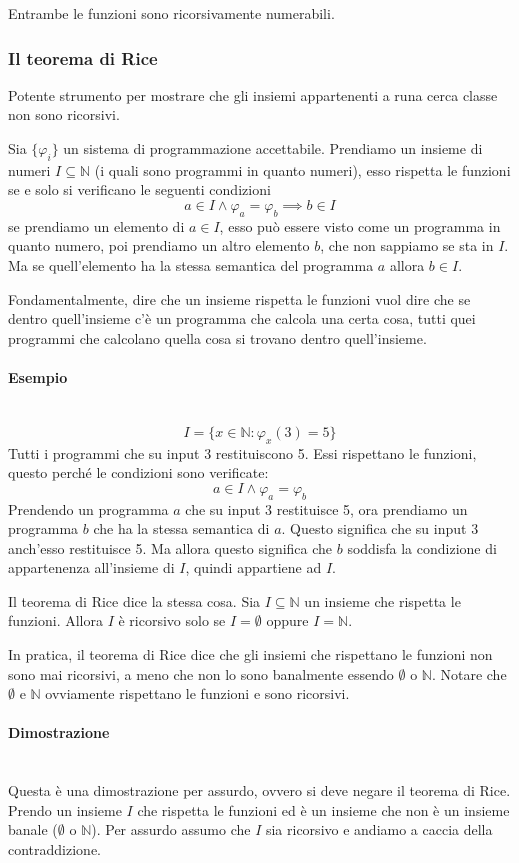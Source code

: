 \documentclass{article}
\begin{document}
Entrambe le funzioni sono ricorsivamente numerabili.

\subsubsection{Il teorema di Rice}
Potente strumento per mostrare che gli insiemi appartenenti a runa cerca classe non
sono ricorsivi.

Sia $\{\varphi_i\}$ un sistema di programmazione accettabile. Prendiamo un insieme di numeri
$I\subseteq\mathbb{N}$ (i quali sono programmi in quanto numeri),
esso rispetta le funzioni se e solo si verificano le seguenti condizioni
$$a\in I\land\varphi_a=\varphi_b\implies b\in I$$
se prendiamo un elemento di $a\in I$, esso può essere visto come un programma in quanto numero, poi
prendiamo un altro elemento $b$, che non sappiamo se sta in $I$. Ma se quell'elemento
ha la stessa semantica del programma $a$ allora $b\in I$.

Fondamentalmente, dire che un insieme rispetta le funzioni vuol dire che se dentro quell'insieme
c'è un programma che calcola una certa cosa, tutti quei programmi che calcolano quella cosa
si trovano dentro quell'insieme.

\paragraph{Esempio}\mbox{}\\
$$I=\{x\in\mathbb{N}:\varphi_x(3)=5\}$$
Tutti i programmi che su input 3 restituiscono 5. Essi rispettano le funzioni, questo
perché le condizioni sono verificate:
$$a\in I\land \varphi_a=\varphi_b$$
Prendendo un programma $a$ che su input 3 restituisce 5, ora prendiamo un programma
$b$ che ha la stessa semantica di $a$. Questo significa che su input 3 anch'esso restituisce
5. Ma allora questo significa che $b$ soddisfa la condizione di appartenenza all'insieme di
$I$, quindi appartiene ad $I$.

Il teorema di Rice dice la stessa cosa. Sia $I\subseteq\mathbb{N}$ un insieme che
rispetta le funzioni. Allora $I$ è ricorsivo solo se $I=\emptyset$ oppure $I=\mathbb{N}$.

In pratica, il teorema di Rice dice che gli insiemi che rispettano le funzioni non sono mai ricorsivi, a meno che
non lo sono banalmente essendo $\emptyset$ o $\mathbb{N}$. Notare che $\emptyset$ e $\mathbb{N}$
ovviamente rispettano le funzioni e sono ricorsivi.

\paragraph{Dimostrazione}\mbox{}\\
Questa è una dimostrazione per assurdo, ovvero si deve negare il teorema di Rice.
Prendo un insieme $I$ che rispetta le funzioni ed è un insieme che non è un insieme banale
($\emptyset$ o $\mathbb{N}$). Per assurdo assumo che $I$ sia ricorsivo e andiamo a caccia
della contraddizione.
\end{document}
